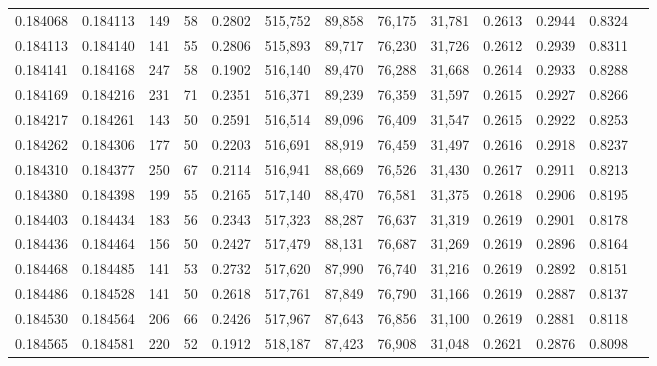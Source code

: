 \begin{tabular}{rrrrrrrrrrrrr}
0.184068 & 0.184113 &   149 &  58 &                                     0.2802 & 515,752 &  89,858 &  76,175 &  31,781 & 0.2613 & 0.2944 & 0.8324 \\
0.184113 & 0.184140 &   141 &  55 &                                     0.2806 & 515,893 &  89,717 &  76,230 &  31,726 & 0.2612 & 0.2939 & 0.8311 \\
0.184141 & 0.184168 &   247 &  58 &                                     0.1902 & 516,140 &  89,470 &  76,288 &  31,668 & 0.2614 & 0.2933 & 0.8288 \\
0.184169 & 0.184216 &   231 &  71 &                                     0.2351 & 516,371 &  89,239 &  76,359 &  31,597 & 0.2615 & 0.2927 & 0.8266 \\
0.184217 & 0.184261 &   143 &  50 &                                     0.2591 & 516,514 &  89,096 &  76,409 &  31,547 & 0.2615 & 0.2922 & 0.8253 \\
0.184262 & 0.184306 &   177 &  50 &                                     0.2203 & 516,691 &  88,919 &  76,459 &  31,497 & 0.2616 & 0.2918 & 0.8237 \\
0.184310 & 0.184377 &   250 &  67 &                                     0.2114 & 516,941 &  88,669 &  76,526 &  31,430 & 0.2617 & 0.2911 & 0.8213 \\
0.184380 & 0.184398 &   199 &  55 &                                     0.2165 & 517,140 &  88,470 &  76,581 &  31,375 & 0.2618 & 0.2906 & 0.8195 \\
0.184403 & 0.184434 &   183 &  56 &                                     0.2343 & 517,323 &  88,287 &  76,637 &  31,319 & 0.2619 & 0.2901 & 0.8178 \\
0.184436 & 0.184464 &   156 &  50 &                                     0.2427 & 517,479 &  88,131 &  76,687 &  31,269 & 0.2619 & 0.2896 & 0.8164 \\
0.184468 & 0.184485 &   141 &  53 &                                     0.2732 & 517,620 &  87,990 &  76,740 &  31,216 & 0.2619 & 0.2892 & 0.8151 \\
0.184486 & 0.184528 &   141 &  50 &                                     0.2618 & 517,761 &  87,849 &  76,790 &  31,166 & 0.2619 & 0.2887 & 0.8137 \\
0.184530 & 0.184564 &   206 &  66 &                                     0.2426 & 517,967 &  87,643 &  76,856 &  31,100 & 0.2619 & 0.2881 & 0.8118 \\
0.184565 & 0.184581 &   220 &  52 &                                     0.1912 & 518,187 &  87,423 &  76,908 &  31,048 & 0.2621 & 0.2876 & 0.8098 \\

\end{tabular}
